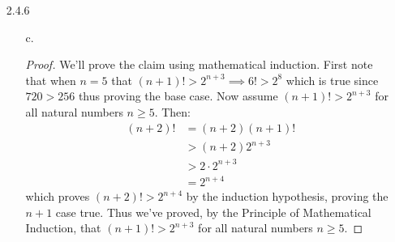 \documentclass[11pt]{amsart}
\theoremstyle{definition}
\begin{document}
\begin{itemize}
\begin{itemize}
    \item[j.]\begin{proof}
        We’ll prove the claim using mathematical induction. First note that when $n=1$ that $3^n\ge 1+2^n\implies 3^1\ge 1+2^n$ which proves the base case. Now assume $3^n\ge 1+2^n$ for all natural numbers $n$. Then $3^{n+1}=3\cdot 3^n\ge 3(1+2^n)$ by the induction hypothesis. Then $3(1+2^n)=(1+2^n)+(1+2^n)+(1+2^n)=3+2^n+2\cdot2^n=3+2^n+2^{n+1}>1+2^{n+1}$ which implies that $3^{n+1}\ge 1+2^{n+1}$ which proves the $n+1$ case. Thus we've proved, by the Principle of Mathematical Induction, that $3^n\ge 1+2^n$ for all natural numbers $n$.
    \end{proof}

    \item[q.]\begin{proof}
        We’ll prove the claim using mathematical induction. First note that when $n=1$ that $|A|=1$ so that $A=\{a\}$, then the power set $\mathscr{P}(A)=\{\varnothing,\{a\}\}$ which implies $|\mathscr{P}(A)|=2$ which proves the base case true as $|\mathscr{P}(A)|=2^{|A|}=2$. Now assume that if $|A|=n$ then $|\mathscr{P}(A)|=2^n$ for all natural numbers $n$. Now let the set $B$ have $n+1$ elements where there exists an element $x\in B$ but $x\notin A$. Then $\mathscr{P}(B)$ has $2^n$ elements excluding $x$ and $2^n$ elements including $x$ by the inductive hypothesis, so $|\mathscr{P}(B)|=2\cdot2^n=2^{n+1}$, so we've proved the $n+1$ case. Thus we've proved, by the Principle of Mathematical Induction, that $\mathscr{P}(A)$ has $2^n$ elements if $A$ has $n$ elements for all $n\in\mathbb{N}$.
    \end{proof}
    
\end{itemize}

\item[2.4.6]
\begin{itemize}
    \item[c.]\begin{proof}
        We’ll prove the claim using mathematical induction. First note that when $n=5$ that $(n+1)!>2^{n+3}\implies 6!>2^8$ which is true since $720>256$ thus proving the base case. Now assume $(n+1)!>2^{n+3}$ for all natural numbers $n\ge 5$. Then:\begin{align*}
            (n+2)!
            &=(n+2)(n+1)! \\
            &>(n+2)2^{n+3} \\
            &>2\cdot2^{n+3} \\
            &=2^{n+4}
        \end{align*}
        which proves $(n+2)!>2^{n+4}$ by the induction hypothesis, proving the $n+1$ case true. Thus we've proved, by the Principle of Mathematical Induction, that $(n+1)!>2^{n+3}$ for all natural numbers $n\ge 5$.
    \end{proof}
    

\end{itemize}
\end{itemize}
\end{document}
